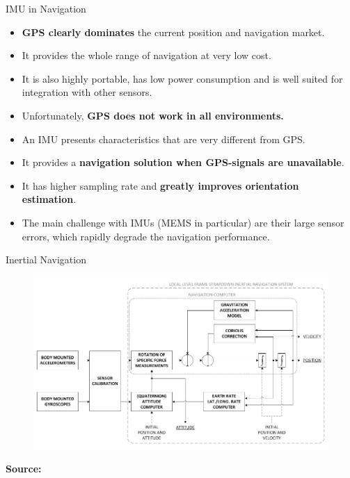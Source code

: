 \documentclass[envcountsect,usenames,dvipsnames]{beamer}
\theoremstyle{mystyle}
\begin{document}
\begin{frame}{IMU in Navigation}
	\begin{exampleblock}{ }
		\begin{itemize}
			\item \textbf{{\color{beamer@UIUCblue}GPS clearly dominates}} the current position and navigation market.
			\item It provides the whole range of navigation at very low cost.
			\item It is also highly portable, has low power consumption and is well suited for integration with other sensors.
			\item Unfortunately, \textbf{{\color{beamer@UIUCblue}GPS does not work in all environments.}}
			\item An IMU presents characteristics that are very different from GPS.
			\item It provides a \textbf{{\color{beamer@UIUCblue}navigation solution when GPS-signals are unavailable}}.
			\item It has higher sampling rate and \textbf{{\color{beamer@UIUCblue}greatly improves orientation estimation}}.
			\item The main challenge with IMUs (MEMS in particular) are their large sensor errors, which rapidly degrade the navigation
			performance.
		\end{itemize}
	\end{exampleblock}
\end{frame}

\begin{frame}{Inertial Navigation}	 
\begin{figure}
	\centering
	\includegraphics[width = 12cm]{Images/INS}
\end{figure}
\vspace{-0.3cm}

\scriptsize{\textbf{{\color{beamer@UIUCblue}Source:}} \cite{stebler2012PHD}}
\end{frame}
\end{document}

